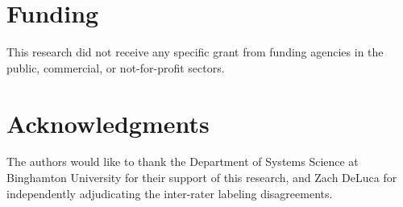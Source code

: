 \documentclass[preprint,12pt]{elsarticle}
\begin{document}
\section*{Funding}

This research did not receive any specific grant from funding agencies in the public, commercial, or not-for-profit sectors.

\section*{Acknowledgments}

The authors would like to thank the Department of Systems Science at Binghamton University for their support of this research, and Zach DeLuca for independently adjudicating the inter-rater labeling disagreements.



\end{document}
